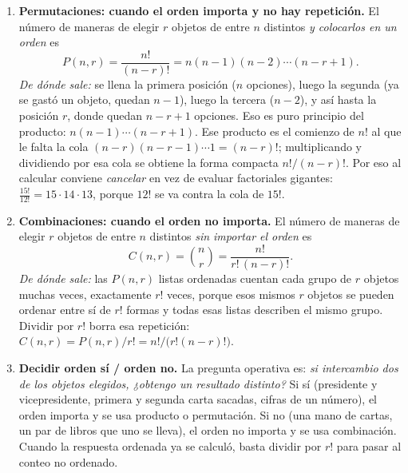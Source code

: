 \documentclass[11pt]{article}
\begin{document}
\begin{teo}
\begin{enumerate}[leftmargin=*]
  \item \textbf{Permutaciones: cuando el orden importa y no hay repetición.} El número de maneras de elegir $r$ objetos de entre $n$ distintos \emph{y colocarlos en un orden} es
  \[
    P(n,r)=\frac{n!}{(n-r)!}=n(n-1)(n-2)\cdots(n-r+1).
  \]
  \emph{De dónde sale:} se llena la primera posición ($n$ opciones), luego la segunda (ya se gastó un objeto, quedan $n-1$), luego la tercera ($n-2$), y así hasta la posición $r$, donde quedan $n-r+1$ opciones. Eso es puro principio del producto: $n(n-1)\cdots(n-r+1)$. Ese producto es el comienzo de $n!$ al que le falta la cola $(n-r)(n-r-1)\cdots 1=(n-r)!$; multiplicando y dividiendo por esa cola se obtiene la forma compacta $n!/(n-r)!$. Por eso al calcular conviene \emph{cancelar} en vez de evaluar factoriales gigantes: $\frac{15!}{12!}=15\cdot 14\cdot 13$, porque $12!$ se va contra la cola de $15!$.

  \item \textbf{Combinaciones: cuando el orden no importa.} El número de maneras de elegir $r$ objetos de entre $n$ distintos \emph{sin importar el orden} es
  \[
    C(n,r)=\binom{n}{r}=\frac{n!}{r!\,(n-r)!}.
  \]
  \emph{De dónde sale:} las $P(n,r)$ listas ordenadas cuentan cada grupo de $r$ objetos muchas veces, exactamente $r!$ veces, porque esos mismos $r$ objetos se pueden ordenar entre sí de $r!$ formas y todas esas listas describen el mismo grupo. Dividir por $r!$ borra esa repetición: $C(n,r)=P(n,r)/r!=n!\big/\big(r!(n-r)!\big)$.

  \item \textbf{Decidir orden sí / orden no.} La pregunta operativa es: \emph{si intercambio dos de los objetos elegidos, ¿obtengo un resultado distinto?} Si sí (presidente y vicepresidente, primera y segunda carta sacadas, cifras de un número), el orden importa y se usa producto o permutación. Si no (una mano de cartas, un par de libros que uno se lleva), el orden no importa y se usa combinación. Cuando la respuesta ordenada ya se calculó, basta dividir por $r!$ para pasar al conteo no ordenado.
\end{enumerate}
\end{teo}
\end{document}
